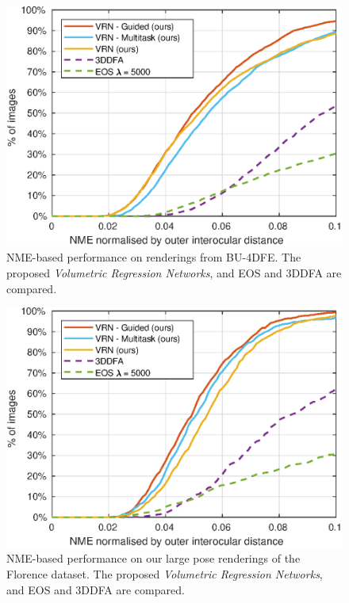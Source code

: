 \begin{figure}
  \centering
  \includegraphics[width=0.75\linewidth]{curves/bu4dfe.eps}
  \caption[NME performance on BU-4DFE renderings]{NME-based
    performance on renderings from BU-4DFE. The proposed
    \textit{Volumetric Regression Networks}, and EOS and 3DDFA are
    compared.}
  \label{roc:bu4dfe}
\end{figure}

\begin{figure}
  \centering
  \includegraphics[width=0.75\linewidth]{curves/florence.eps}
  \caption[NME performance on Florence renderings]{NME-based
    performance on our large pose renderings of the Florence
    dataset. The proposed \textit{Volumetric Regression Networks}, and
    EOS and 3DDFA are compared.}
  \label{roc:florence}
\end{figure}



